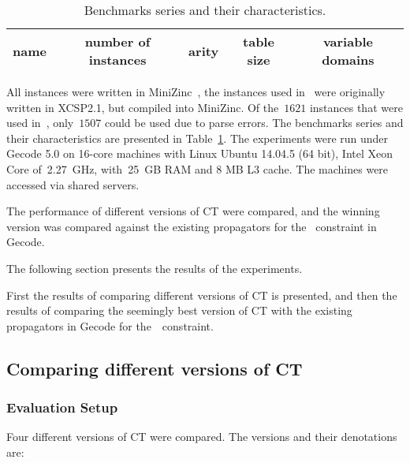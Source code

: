 \documentclass[a4paper,11pt]{article}
\newcommand{\Secref}[1]{Section~\ref{#1}}
\newcommand{\Table}{\Constraint{Table}}
\newcommand{\CTpaper}[0]{DBLP:conf/cp/DemeulenaereHLP16}
\numberwithin{equation}{section}
\begin{document}
  \begin{table}[h]%
    \caption{Benchmarks series and their characteristics.}
    \label{tab:benchmarks}
    
    \begin{sideways}
      \centering
      \begin{tabular}{lcccc}  %
        name & number of instances & arity & table size & variable domains \\
        \midrule
         
      \end{tabular}
    \end{sideways}
    \end{table}


All instances were written in MiniZinc~\cite{MiniZinc}, the
instances used in~\cite{\CTpaper} were originally written in XCSP2.1,
but compiled into MiniZinc. Of the~$1621$ instances that were used in~\cite{\CTpaper},
only~$1507$ could be used due to parse errors.
The benchmarks series and their characteristics are presented in Table~\ref{tab:benchmarks}.
The experiments were run
under Gecode 5.0 on 16-core machines with Linux Ubuntu 14.04.5 (64 bit),
Intel Xeon Core of~2.27~GHz, with~25~GB RAM and 8 MB L3 cache. The machines
were accessed via shared servers.

The performance of different versions of CT were compared, and the winning
version was compared against the existing propagators for
the \Table~constraint in Gecode.

The following section presents the results of the experiments.

First the results of comparing different versions of CT is presented,
and then the results of comparing the seemingly best version of CT with 
the existing propagators in Gecode for the~\Table~constraint.





\subsection{Comparing different versions of CT}
\label{sec:compare}

\subsubsection{Evaluation Setup}
Four different versions of CT were compared.
The versions and their denotations are:
\end{document}
